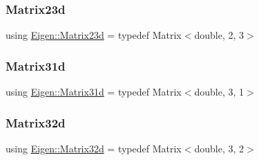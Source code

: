 \subsubsection{\texorpdfstring{Matrix23d}{Matrix23d}}
{\footnotesize\ttfamily using \hyperlink{namespaceEigen_a6b59c2ed598454edf0ba0b2be5487582}{Eigen\+::\+Matrix23d} = typedef Matrix$<$double, 2, 3$>$}

\mbox{\label{namespaceEigen_a21256313243afb53cb924a5852253dac}} 
\subsubsection{\texorpdfstring{Matrix31d}{Matrix31d}}
{\footnotesize\ttfamily using \hyperlink{namespaceEigen_a21256313243afb53cb924a5852253dac}{Eigen\+::\+Matrix31d} = typedef Matrix$<$double, 3, 1$>$}

\mbox{\label{namespaceEigen_a4bc13f7bc164b152307bec23b85f81ab}} 
\subsubsection{\texorpdfstring{Matrix32d}{Matrix32d}}
{\footnotesize\ttfamily using \hyperlink{namespaceEigen_a4bc13f7bc164b152307bec23b85f81ab}{Eigen\+::\+Matrix32d} = typedef Matrix$<$double, 3, 2$>$}

